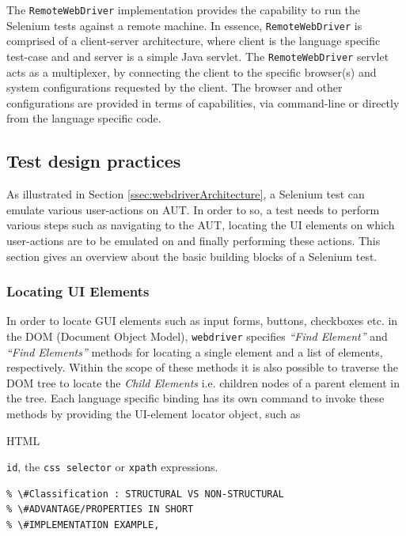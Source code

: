 The \texttt{RemoteWebDriver} implementation provides the capability to run the Selenium tests against a remote machine. In essence, \texttt{RemoteWebDriver} is comprised of a client-server architecture, where client is the language specific test-case and and server is a simple Java servlet. The \texttt{RemoteWebDriver} servlet acts as a multiplexer, by connecting the client to the specific browser(s) and system configurations requested by the client. The browser and other configurations are provided in terms of capabilities, via command-line or directly from the language specific code.
\subsection{Test design practices}
\label{testDesignPractices}
As illustrated in Section \ref{ssec:webdriverArchitecture}, a Selenium test can emulate various user-actions on AUT. In order to so, a test needs to perform various steps such as navigating to the AUT, locating the UI elements on which user-actions are to be emulated on and finally performing these actions. This section gives an overview about the basic building blocks of a Selenium test. 
\subsubsection*{Locating UI Elements}
\label{ssec:locatingUIElements}
In order to locate GUI elements such as input forms, buttons, checkboxes etc. in the DOM (Document Object Model), \texttt{webdriver} specifies \textit{``Find Element''} and \textit{``Find Elements''} methods for locating a single element and a list of elements, respectively. Within the scope of these methods it is also possible to traverse the DOM tree to locate the \textit{Child Elements} i.e. children nodes of a parent element in the tree. Each language specific binding has its own command to invoke these methods by providing the UI-element locator object, such as\begin{small} HTML\end{small} \texttt{id}, the \texttt{css selector} or \texttt{xpath} expressions.

\begin{verbatim}
% \#Classification : STRUCTURAL VS NON-STRUCTURAL
% \#ADVANTAGE/PROPERTIES IN SHORT
% \#IMPLEMENTATION EXAMPLE,
\end{verbatim}

